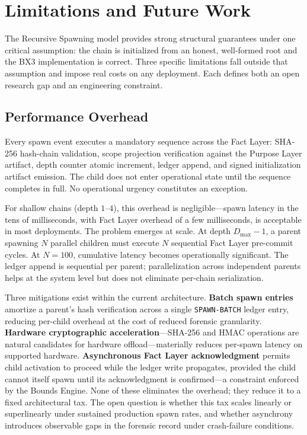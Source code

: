\section{Limitations and Future Work}
\label{sec:limitations}

The Recursive Spawning model provides strong structural guarantees under one critical assumption: the chain is initialized from an honest, well-formed root and the BX3 implementation is correct. Three specific limitations fall outside that assumption and impose real costs on any deployment. Each defines both an open research gap and an engineering constraint.

\subsection{Performance Overhead}
\label{sec:lim-perf}

Every spawn event executes a mandatory sequence across the Fact Layer: SHA-256 hash-chain validation, scope projection verification against the Purpose Layer artifact, depth counter atomic increment, ledger append, and signed initialization artifact emission. The child does not enter operational state until the sequence completes in full. No operational urgency constitutes an exception.

For shallow chains (depth $1$--$4$), this overhead is negligible---spawn latency in the tens of milliseconds, with Fact Layer overhead of a few milliseconds, is acceptable in most deployments. The problem emerges at scale. At depth $D_{\max} - 1$, a parent spawning $N$ parallel children must execute $N$ sequential Fact Layer pre-commit cycles. At $N = 100$, cumulative latency becomes operationally significant. The ledger append is sequential per parent; parallelization across independent parents helps at the system level but does not eliminate per-chain serialization.

Three mitigations exist within the current architecture. \textbf{Batch spawn entries} amortize a parent's hash verification across a single \texttt{SPAWN-BATCH} ledger entry, reducing per-child overhead at the cost of reduced forensic granularity. \textbf{Hardware cryptographic acceleration}---SHA-256 and HMAC operations are natural candidates for hardware offload---materially reduces per-spawn latency on supported hardware. \textbf{Asynchronous Fact Layer acknowledgment} permits child activation to proceed while the ledger write propagates, provided the child cannot itself spawn until its acknowledgment is confirmed---a constraint enforced by the Bounds Engine. None of these eliminates the overhead; they reduce it to a fixed architectural tax. The open question is whether this tax scales linearly or superlinearly under sustained production spawn rates, and whether asynchrony introduces observable gaps in the forensic record under crash-failure conditions.

